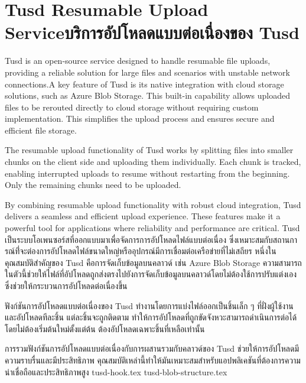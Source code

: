 \section{\ifenglish Tusd Resumable Upload Service\else บริการอัปโหลดแบบต่อเนื่องของ Tusd\fi}
\ifenglish
Tusd is an open-source service designed to handle resumable file uploads, providing a reliable solution for large files and scenarios with unstable network connections.\enskip A key feature of Tusd is its native integration with cloud storage solutions, such as Azure Blob Storage. This built-in capability allows uploaded files to be rerouted directly to cloud storage without requiring custom implementation. This simplifies the upload process and ensures secure and efficient file storage.

The resumable upload functionality of Tusd works by splitting files into smaller chunks on the client side and uploading them individually. Each chunk is tracked, enabling interrupted uploads to resume without restarting from the beginning. Only the remaining chunks need to be uploaded.

By combining resumable upload functionality with robust cloud integration, Tusd delivers a seamless and efficient upload experience. These features make it a powerful tool for applications where reliability and performance are critical.
\else
Tusd เป็นระบบโอเพนซอร์สที่ออกแบบมาเพื่อจัดการการอัปโหลดไฟล์แบบต่อเนื่อง ซึ่งเหมาะสมกับสถานการณ์ที่่จะต่องการอัปโหลดไฟล์ขนาดใหญ่หรืออุปกรณ์มีการเชื่อมต่อเครือข่ายที่ไม่เสถียร หนึ่งในคุณสมบัติสำคัญของ Tusd คือการจัดเก็บข้อมูลบนคลาวด์ เช่น Azure Blob Storage ความสามารถในตัวนี้ช่วยให้ไฟล์ที่อัปโหลดถูกส่งตรงไปยังการจัดเก็บข้อมูลบนคลาวด์โดยไม่ต้องใช้การปรับแต่งเอง ซึ่งช่วยให้กระบวนการอัปโหลดต่อเนื่องขึ้น

ฟังก์ชันการอัปโหลดแบบต่อเนื่องของ Tusd ทำงานโดยการแบ่งไฟล์ออกเป็นชิ้นเล็ก ๆ ที่ฝั่งผู้ใช้งานและอัปโหลดทีละชิ้น แต่ละชิ้นจะถูกติดตาม ทำให้การอัปโหลดที่ถูกขัดจังหวะสามารถดำเนินการต่อได้โดยไม่ต้องเริ่มต้นใหม่ตั้งแต่ต้น ต้องอัปโหลดเฉพาะชิ้นที่เหลือเท่านั้น

การรวมฟังก์ชันการอัปโหลดแบบต่อเนื่องกับการผสานรวมกับคลาวด์ของ Tusd ช่วยให้การอัปโหลดมีความราบรื่นและมีประสิทธิภาพ คุณสมบัติเหล่านี้ทำให้มันเหมาะสมสำหรับแอปพลิเคชันที่ต้องการความน่าเชื่อถือและประสิทธิภาพสูง
\fi
\newcommand{\tusdDir}{chapters/approach/tusd}
{tusd-hook.tex}
{tusd-blob-structure.tex}
